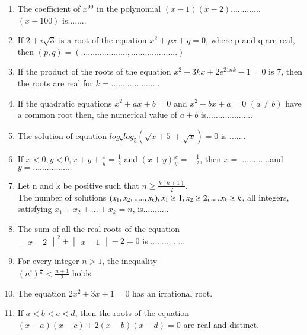 \documentclass[journal,12pt,twocolumn]{IEEEtran}
\begin{document}
\begin{enumerate}[label=\arabic*]
\item The coefficient of $x^{99}$ in the polynomial
$(x-1)(x-2)$.............$(x-100)$ is........

\item If $2+i\sqrt{3}$ is a root of the equation
 $x^{2} +px+q=0$, where p and q are real, then
$(p,q)=(.................... , ....................)$

\item If the product of the roots of the equation
$x^{2}-3kx+2e^{21nk}-1=0$ is $7$, then the roots are real for
$k=.....................$

\item If the quadratic equations $x^{2} +ax+b=0$ and $x^{2}+bx+a=0$ $(a\neq b)$ have a common root then, the numerical value of $a+b$ is....................

\item The solution of equation
$log_7 log_5(\sqrt{x+5}+\sqrt{x})=0$ is .......

\item If $x<0,y<0,x+y+\frac{x} {y}=\frac{1}{2}$ and $(x+y)\frac{x}{y}=-\frac{1}{2}$, then $x=.............$and $y=.................$

\item Let n and k be positive such that $n\geq{\frac{k(k+1)}{2}}$.\\ The number of solutions $(x_1, x_2,.....,x_k), \\x_1\geq{1}, x_2\geq{2},...,x_k\geq{k}$, all integers, satisfying $x_1+x_2+...+x_k=n$, is...........

\item The sum of all the real roots of the equation\\$\begin{vmatrix} x-2 \end{vmatrix}^{2} + \begin{vmatrix} x-1 \end{vmatrix}-2 = 0$ is................

\item For every integer $n>1$, the inequality\\$(n!)^{\frac{1}{n}}<\frac{n+1}{2}$ holds.

\item The equation $2x^{2}+3x+1=0$ has an irrational root.

\item If $a<b<c<d$, then the roots of the equation\\
$(x-a)(x-c)+2(x-b)(x-d)=0$ are real and distinct.


\end{enumerate}
\end{document}
